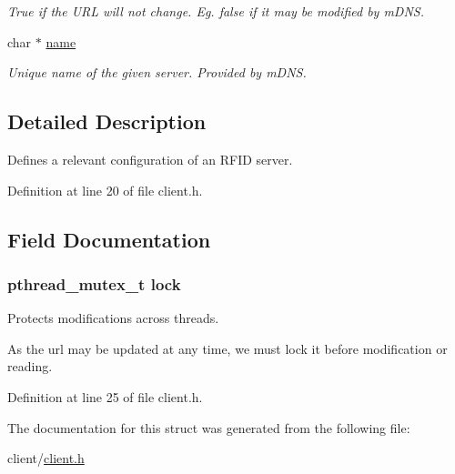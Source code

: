 \begin{DoxyCompactItemize}
\begin{DoxyCompactList}\small\item\em True if the URL will not change. Eg. false if it may be modified by mDNS. \item\end{DoxyCompactList}\item 
\hypertarget{structrfid__server__info_a5ac083a645d964373f022d03df4849c8}{
char $\ast$ \hyperlink{structrfid__server__info_a5ac083a645d964373f022d03df4849c8}{name}}
\label{structrfid__server__info_a5ac083a645d964373f022d03df4849c8}

\begin{DoxyCompactList}\small\item\em Unique name of the given server. Provided by mDNS. \item\end{DoxyCompactList}\end{DoxyCompactItemize}


\subsection{Detailed Description}
Defines a relevant configuration of an RFID server. 

Definition at line 20 of file client.h.



\subsection{Field Documentation}
\hypertarget{structrfid__server__info_a0abaf4b5d42c4e5d19190035fade3599}{
\subsubsection[{lock}]{\setlength{\rightskip}{0pt plus 5cm}pthread\_\-mutex\_\-t {\bf lock}}}
\label{structrfid__server__info_a0abaf4b5d42c4e5d19190035fade3599}


Protects modifications across threads. 

As the url may be updated at any time, we must lock it before modification or reading. 

Definition at line 25 of file client.h.



The documentation for this struct was generated from the following file:\begin{DoxyCompactItemize}
\item 
client/\hyperlink{client_8h}{client.h}\end{DoxyCompactItemize}
